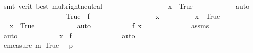 \begin{isabellebody}
\ {\isacharparenleft}{\kern0pt}smt\ {\isacharparenleft}{\kern0pt}verit{\isacharcomma}{\kern0pt}\ best{\isacharparenright}{\kern0pt}\ mult{\isachardot}{\kern0pt}right{\isacharunderscore}{\kern0pt}neutral{\isacharparenright}{\kern0pt}\ \ \ \ \ \ \ \isanewline
\ \ \ \ \ \ \ \ \isamarkupfalse%
\ \isamarkupfalse%
\ {\isachardoublequoteopen}x\ {\isasymin}\ {\isacharbraceleft}{\kern0pt}True{\isacharbraceright}{\kern0pt}{\isachardoublequoteclose}\isanewline
\ \ \ \ \ \ \ \ \ \ \isamarkupfalse%
\ auto\isanewline
\ \ \ \ \ \ \isamarkupfalse%
\isanewline
\ \ \ \ \isamarkupfalse%
\isanewline
\ \ \ \ \ \ \isamarkupfalse%
\ {\isachardoublequoteopen}{\isacharbraceleft}{\kern0pt}True{\isacharbraceright}{\kern0pt}\ {\isasymsubseteq}\ f\ {\isacharminus}{\kern0pt}{\isacharbackquote}{\kern0pt}\ {\isacharbraceleft}{\kern0pt}{}{\isacharbraceright}{\kern0pt}{\isachardoublequoteclose}\isanewline
\ \ \ \ \ \ \isamarkupfalse%
\isanewline
\ \ \ \ \ \ \ \ \isamarkupfalse%
\ x\isanewline
\ \ \ \ \ \ \ \ \isamarkupfalse%
\ {\isachardoublequoteopen}x\ {\isasymin}\ {\isacharbraceleft}{\kern0pt}True{\isacharbraceright}{\kern0pt}{\isachardoublequoteclose}\isanewline
\ \ \ \ \ \ \ \ \isamarkupfalse%
\ \isamarkupfalse%
\ {\isachardoublequoteopen}x\ {\isacharequal}{\kern0pt}\ True{\isachardoublequoteclose}\isanewline
\ \ \ \ \ \ \ \ \ \ \isamarkupfalse%
\ auto\isanewline
\ \ \ \ \ \ \ \ \isamarkupfalse%
\ \isamarkupfalse%
\ {\isachardoublequoteopen}f\ x\ {\isacharequal}{\kern0pt}\ {}{\isachardoublequoteclose}\isanewline
\ \ \ \ \ \ \ \ \ \ \isamarkupfalse%
\ assms\isanewline
\ \ \ \ \ \ \ \ \ \ \isamarkupfalse%
\ auto\isanewline
\ \ \ \ \ \ \ \ \isamarkupfalse%
\ \isamarkupfalse%
\ {\isachardoublequoteopen}x\ {\isasymin}\ f\ {\isacharminus}{\kern0pt}{\isacharbackquote}{\kern0pt}\ {\isacharbraceleft}{\kern0pt}{}{\isacharbraceright}{\kern0pt}{\isachardoublequoteclose}\isanewline
\ \ \ \ \ \ \ \ \ \ \isamarkupfalse%
\ auto\isanewline
\ \ \ \ \ \ \isamarkupfalse%
\isanewline
\ \ \ \ \isamarkupfalse%
\isanewline
\ \ \ \ \isamarkupfalse%
\ {\isachardoublequoteopen}emeasure\ m\ {\isacharparenleft}{\kern0pt}{\isacharbraceleft}{\kern0pt}True{\isacharbraceright}{\kern0pt}{\isacharparenright}{\kern0pt}\ {\isacharequal}{\kern0pt}\ \ p{}{\isachardoublequoteclose}\isanewline

\end{isabellebody}
